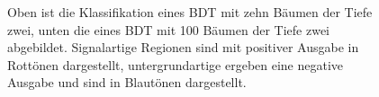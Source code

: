\begin{figure}[tbp]
\centering     %
{}
\parbox[b]{12cm}{
\caption{Oben ist die Klassifikation eines BDT mit zehn B\"aumen der Tiefe zwei, unten die eines BDT mit 100 B\"aumen der Tiefe zwei abgebildet. Signalartige Regionen sind mit positiver Ausgabe in Rott\"onen dargestellt, untergrundartige ergeben eine negative Ausgabe und sind in Blaut\"onen dargestellt.}
}
\label{fig:boosting}
\end{figure}


